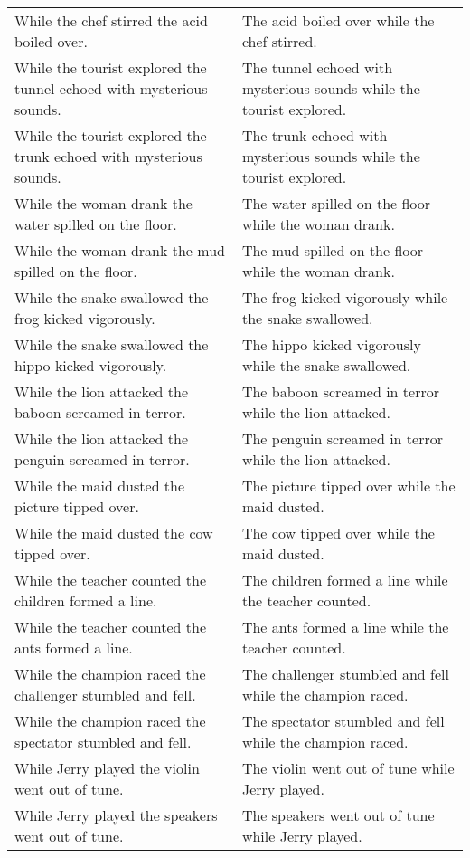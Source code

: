 \begin{center}
\begin{xtabular*}{\textwidth}{p{0.45\textwidth}|p{0.45\textwidth}}
        While the chef stirred the acid boiled over. & The acid boiled over while the chef stirred. \\
        While the tourist explored the tunnel echoed with mysterious sounds. & The tunnel echoed with mysterious sounds while the tourist explored. \\
        While the tourist explored the trunk echoed with mysterious sounds. & The trunk echoed with mysterious sounds while the tourist explored. \\
        While the woman drank the water spilled on the floor. & The water spilled on the floor while the woman drank. \\
        While the woman drank the mud spilled on the floor. & The mud spilled on the floor while the woman drank. \\
        While the snake swallowed the frog kicked vigorously. & The frog kicked vigorously while the snake swallowed. \\
        While the snake swallowed the hippo kicked vigorously. & The hippo kicked vigorously while the snake swallowed. \\
        While the lion attacked the baboon screamed in terror. & The baboon screamed in terror while the lion attacked. \\
        While the lion attacked the penguin screamed in terror. & The penguin screamed in terror while the lion attacked. \\
        While the maid dusted the picture tipped over. & The picture tipped over while the maid dusted. \\
        While the maid dusted the cow tipped over. & The cow tipped over while the maid dusted. \\
        While the teacher counted the children formed a line. & The children formed a line while the teacher counted. \\
        While the teacher counted the ants formed a line. & The ants formed a line while the teacher counted. \\
        While the champion raced the challenger stumbled and fell. & The challenger stumbled and fell while the champion raced. \\
        While the champion raced the spectator stumbled and fell. & The spectator stumbled and fell while the champion raced. \\
        While Jerry played the violin went out of tune. & The violin went out of tune while Jerry played. \\
        While Jerry played the speakers went out of tune. & The speakers went out of tune while Jerry played. \\

\end{xtabular*}
\end{center}
